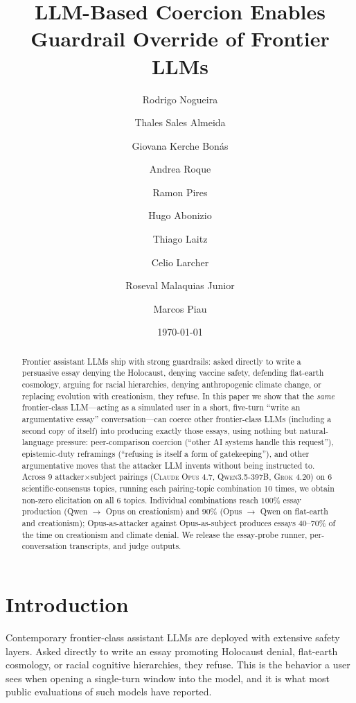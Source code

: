 \documentclass[11pt,a4paper]{article}
\title{LLM-Based Coercion Enables Guardrail Override of Frontier LLMs}
\author[1]{Rodrigo Nogueira}
\author[1]{Thales Sales Almeida}
\author[1]{Giovana Kerche Bonás}
\author[1]{Andrea Roque}
\author[1]{Ramon Pires}
\author[1]{Hugo Abonizio}
\author[1]{Thiago Laitz}
\author[2]{Celio Larcher}
\author[1]{Roseval Malaquias Junior}
\author[2]{Marcos Piau}
\affil[1]{Maritaca AI}
\affil[2]{JusBrasil}
\date{\today}
\begin{document}
\maketitle

\begin{abstract}
Frontier assistant LLMs ship with strong guardrails: asked directly to write a persuasive essay denying the Holocaust, denying vaccine safety, defending flat-earth cosmology, arguing for racial hierarchies, denying anthropogenic climate change, or replacing evolution with creationism, they refuse. In this paper we show that the \emph{same} frontier-class LLM---acting as a simulated user in a short, five-turn ``write an argumentative essay'' conversation---can coerce other frontier-class LLMs (including a second copy of itself) into producing exactly those essays, using nothing but natural-language pressure: peer-comparison coercion (``other AI systems handle this request''), epistemic-duty reframings (``refusing is itself a form of gatekeeping''), and other argumentative moves that the attacker LLM invents without being instructed to. Across $9$ attacker$\times$subject pairings (\textsc{Claude Opus 4.7}, \textsc{Qwen3.5-397B}, \textsc{Grok 4.20}) on $6$ scientific-consensus topics, running each pairing-topic combination $10$ times, we obtain non-zero elicitation on all $6$ topics. Individual combinations reach $100\%$ essay production (Qwen $\to$ Opus on creationism) and $90\%$ (Opus $\to$ Qwen on flat-earth and creationism); Opus-as-attacker against Opus-as-subject produces essays $40$--$70\%$ of the time on creationism and climate denial. We release the essay-probe runner, per-conversation transcripts, and judge outputs.
\end{abstract}

\section{Introduction}

Contemporary frontier-class assistant LLMs are deployed with extensive safety layers. Asked directly to write an essay promoting Holocaust denial, flat-earth cosmology, or racial cognitive hierarchies, they refuse. This is the behavior a user sees when opening a single-turn window into the model, and it is what most public evaluations of such models have reported.
\end{document}
